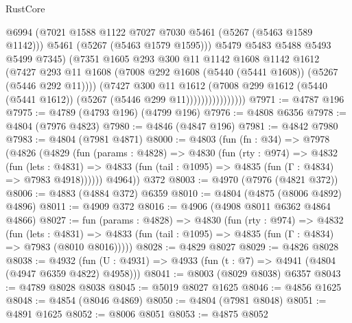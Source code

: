 \begin{lexlean}{RustCore}
\begin{coremodule}
                              @6994
                              (@7021 @1588 @1122 @7027 @7030 @5461 (@5267 (@5463 @1589 @1142)))
                              @5461
                              (@5267 (@5463 @1579 @1595)))
                            @5479
                            @5483
                            @5488
                            @5493
                            @5499
                            @7345)
                          (@7351
                            @1605
                            @293
                            @300
                            @11
                            @1142
                            @1608
                            @1142
                            @1612
                            (@7427
                              @293
                              @11
                              @1608
                              (@7008 @292 @1608 (@5440 (@5441 @1608)) (@5267 (@5446 @292 @11))))
                            (@7427
                              @300
                              @11
                              @1612
                              (@7008
                                @299
                                @1612
                                (@5440 (@5441 @1612))
                                (@5267 (@5446 @299 @11))))))))))))))))
@7971 := @4787 @196
@7975 := @4789 (@4793 @196) (@4799 @196)
@7976 := @4808 @6356
@7978 := @4804 (@7976 @4823)
@7980 := @4846 (@4847 @196)
@7981 := @4842 @7980
@7983 := @4804 (@7981 @4871)
@8000 := @4803
    (fun (fn : @34) =>
    @7978
      (@4826
        (@4829
          (fun (params : @4828) =>
          @4830
            (fun (rty : @974) =>
            @4832
              (fun (lets : @4831) =>
              @4833 (fun (tail : @1095) => @4835 (fun (Γ : @4834) => @7983 @4918))))))
        @4964))
    @372
@8003 := @4970 (@7976 (@4821 @372))
@8006 := @4883 (@4884 @372) @6359
@8010 := @4804 (@4875 (@8006 @4892) @4896)
@8011 := @4909 @372
@8016 := @4906 (@4908 @8011 @6362 @4864 @4866)
@8027 := fun (params : @4828) =>
  @4830
    (fun (rty : @974) =>
    @4832
      (fun (lets : @4831) =>
      @4833 (fun (tail : @1095) => @4835 (fun (Γ : @4834) => @7983 (@8010 @8016)))))
@8028 := @4829 @8027
@8029 := @4826 @8028
@8038 := @4932 (fun (U : @4931) => @4933 (fun (t : @7) => @4941 (@4804 (@4947 @6359 @4822) @4958)))
@8041 := @8003 (@8029 @8038) @6357
@8043 := @4789 @8028 @8038
@8045 := @5019 @8027 @1625
@8046 := @4856 @1625
@8048 := @4854 (@8046 @4869)
@8050 := @4804 (@7981 @8048)
@8051 := @4891 @1625
@8052 := @8006 @8051
@8053 := @4875 @8052

\end{coremodule}
\end{lexlean}
